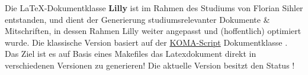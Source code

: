 Die \LaTeX-Dokumentklasse \textbf{Lilly} ist im Rahmen des Studiums von Florian Sihler entstanden, und dient der Generierung studiumsrelevanter Dokumente \& Mitschriften, in dessen Rahmen Lilly weiter angepasst und (hoffentlich) optimiert wurde. Die klassische Version basiert auf der \href{https://komascript.de}{KOMA-Script} Dokumentklasse .\newline
Das Ziel ist es auf Basis eines Makefiles das Latexdokument direkt in verschiedenen Versionen zu generieren! Die aktuelle Version \say{\LILLYxVERSIONxLONG} besitzt den Status \LILLYxSTATUS!